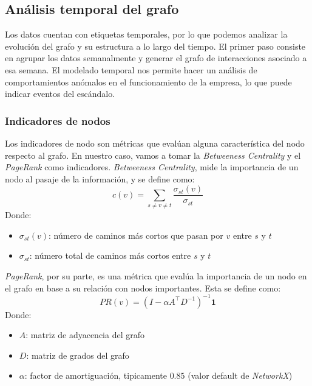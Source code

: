 \documentclass{article}
\begin{document}
\subsection{Análisis temporal del grafo}
Los datos cuentan con etiquetas temporales, por lo que podemos analizar la evolución del grafo y su estructura a lo largo del tiempo. El primer paso consiste en 
agrupar los datos semanalmente y generar el grafo de interacciones asociado a esa semana.  El modelado temporal nos permite hacer un análisis de comportamientos
anómalos en el funcionamiento de la empresa, lo que puede indicar eventos del escándalo.

\subsubsection{Indicadores de nodos}

Los indicadores de nodo son métricas que evalúan alguna característica del nodo respecto al grafo. En nuestro caso, vamos a tomar la \emph{Betweeness Centrality} y el \emph{PageRank} como indicadores. \emph{Betweeness Centrality}, mide la importancia de un nodo al pasaje de la información, y se define como:
\begin{equation}
    c(v) = \sum_{s \neq v \neq t} \frac{\sigma_{st}(v)}{\sigma_{st}}
    \label{eq:betweeness_centrality}
\end{equation}
Donde:
\begin{itemize}
    \item $\sigma_{st}(v)$: número de caminos más cortos que pasan por $v$ entre $s$ y $t$
    \item $\sigma_{st}$: número total de caminos más cortos entre $s$ y $t$
\end{itemize}
\emph{PageRank}, por su parte, es una métrica que evalúa la importancia de un nodo en el grafo en base a su relación con nodos importantes. Esta se define como:
\begin{equation}
    PR(v) = (I - \alpha A^\top D^{-1})^{-1} \mathbf{1}
    \label{eq:page_rank}
\end{equation}
Donde:
\begin{itemize}
    \item $A$: matriz de adyacencia del grafo
    \item $D$: matriz de grados del grafo
    \item $\alpha$: factor de amortiguación, tipicamente $0.85$ (valor default de \textit{NetworkX})
\end{itemize}
\end{document}
